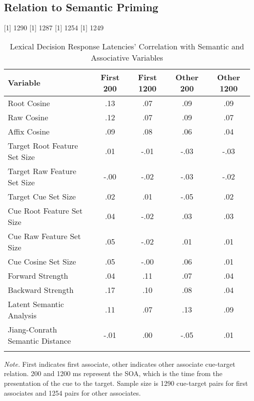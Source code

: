 \documentclass[english,,man]{apa6}
\theoremstyle{definition}
\theoremstyle{definition}
\theoremstyle{definition}
\theoremstyle{remark}
\begin{document}
\hypertarget{relation-to-semantic-priming}{%
\subsection{Relation to Semantic
Priming}\label{relation-to-semantic-priming}}

{[}1{]} 1290 {[}1{]} 1287 {[}1{]} 1254 {[}1{]} 1249

\begin{table}[tbp]
\begin{center}
\begin{threeparttable}
\caption{\label{tab:ldt-table}Lexical Decision Response Latencies' Correlation with Semantic and Associative Variables}
\begin{tabular}{lcccc}
\toprule
Variable & \multicolumn{1}{c}{First 200} & \multicolumn{1}{c}{First 1200} & \multicolumn{1}{c}{Other 200} & \multicolumn{1}{c}{Other 1200}\\
\midrule
Root Cosine & .13 & .07 & .09 & .09\\
Raw Cosine & .12 & .07 & .09 & .07\\
Affix Cosine & .09 & .08 & .06 & .04\\
Target Root Feature Set Size & .01 & -.01 & -.03 & -.03\\
Target Raw Feature Set Size & -.00 & -.02 & -.03 & -.02\\
Target Cue Set Size & .02 & .01 & -.05 & .02\\
Cue Root Feature Set Size & .04 & -.02 & .03 & .03\\
Cue Raw Feature Set Size & .05 & -.02 & .01 & .01\\
Cue Cosine Set Size & .05 & -.00 & .06 & .01\\
Forward Strength & .04 & .11 & .07 & .04\\
Backward Strength & .17 & .10 & .08 & .04\\
Latent Semantic Analysis & .11 & .07 & .13 & .09\\
Jiang-Conrath Semantic Distance & -.01 & .00 & -.05 & .01\\
\bottomrule
\addlinespace
\end{tabular}
\begin{tablenotes}[para]
\normalsize{\textit{Note.} First indicates first associate, other indicates other associate cue-target relation. 200 and 1200 ms represent the SOA, which is the time from the presentation of the cue to the target. Sample size is 1290 cue-target pairs for first associates and 1254 pairs for other associates.}
\end{tablenotes}
\end{threeparttable}
\end{center}
\end{table}
\end{document}

